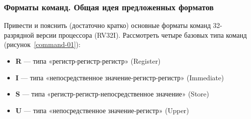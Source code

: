 \subsubsection{Форматы команд. Общая идея предложенных форматов}
Привести и пояснить (достаточно кратко) основные форматы команд 32-разрядной версии процессора (RV32I). Рассмотреть четыре базовых типа команд (рисунок~\ref{command-01}):
\begin{itemize}
    \item \textbf{R} --- типа «регистр-регистр-регистр» (Register)
    \item \textbf{I} --- типа «непосредственное значение-регистр-регистр» (Immediate)
    \item \textbf{S} --- типа «регистр-регистр-непосредственное значение» (Store)
    \item \textbf{U} --- типа «непосредственное значение-регистр» (Upper)
\end{itemize}

